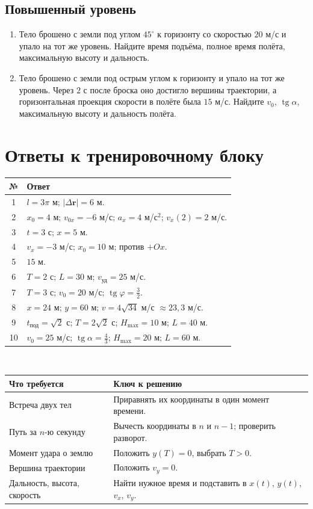 \documentclass[a4paper,12pt]{article}
\newcommand{\vct}[1]{\boldsymbol{#1}}
\begin{document}
\subsection{Повышенный уровень}
\begin{enumerate}[label=\textbf{\arabic*.},start=9]
\item Тело брошено с земли под углом $45^\circ$ к горизонту со скоростью $20$ м/с и упало на тот же уровень. Найдите время подъёма, полное время полёта, максимальную высоту и дальность.
\item Тело брошено с земли под острым углом к горизонту и упало на тот же уровень. Через $2$ с после броска оно достигло вершины траектории, а горизонтальная проекция скорости в полёте была $15$ м/с. Найдите $v_0$, $\operatorname{tg}\alpha$, максимальную высоту и дальность полёта.
\end{enumerate}

\clearpage
\section*{Ответы к тренировочному блоку}
\noindent\begin{tabularx}{\linewidth}{@{}cX@{}}
\toprule
\textbf{№} & \textbf{Ответ}\\
\midrule
1 & $l=3\pi$ м; $|\Delta\vct r|=6$ м.\\
2 & $x_0=4$ м; $v_{0x}=-6$ м/с; $a_x=4$ м/с$^2$; $v_x(2)=2$ м/с.\\
3 & $t=3$ с; $x=5$ м.\\
4 & $v_x=-3$ м/с; $x_0=10$ м; против $+Ox$.\\
5 & $15$ м.\\
6 & $T=2$ с; $L=30$ м; $v_{\text{уд}}=25$ м/с.\\
7 & $T=3$ с; $v_0=20$ м/с; $\operatorname{tg}\varphi=\frac32$.\\
8 & $x=24$ м; $y=60$ м; $v=4\sqrt{34}$ м/с $\approx23{,}3$ м/с.\\
9 & $t_{\text{под}}=\sqrt2$ с; $T=2\sqrt2$ с; $H_{\max}=10$ м; $L=40$ м.\\
10 & $v_0=25$ м/с; $\operatorname{tg}\alpha=\frac43$; $H_{\max}=20$ м; $L=60$ м.\\
\bottomrule
\end{tabularx}

\vspace{1.3cm}
\\[-1mm]
\begin{tabularx}{\linewidth}{@{}p{.37\linewidth}X@{}}
\toprule
\textbf{Что требуется} & \textbf{Ключ к решению}\\
\midrule
Встреча двух тел & Приравнять их координаты в один момент времени.\\
Путь за $n$-ю секунду & Вычесть координаты в $n$ и $n-1$; проверить разворот.\\
Момент удара о землю & Положить $y(T)=0$, выбрать $T>0$.\\
Вершина траектории & Положить $v_y=0$.\\
Дальность, высота, скорость & Найти нужное время и подставить в $x(t)$, $y(t)$, $v_x$, $v_y$.\\
\bottomrule
\end{tabularx}
\end{document}
